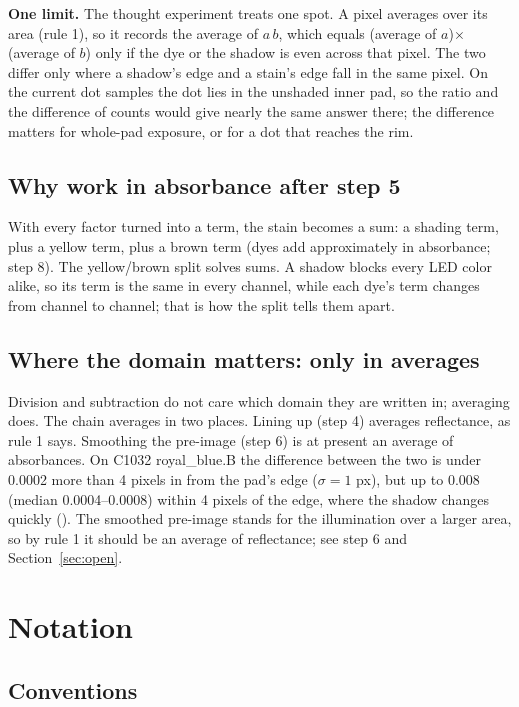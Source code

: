 \documentclass[11pt,letter]{article}
\newcommand{\file}[1]{\texttt{\seqsplit{#1}}}
\begin{document}
\textbf{One limit.}  The thought experiment treats one spot.  A pixel
averages over its area (rule 1), so it records the average of $a\,b$, which
equals (average of $a$)$\times$(average of $b$) only if the dye or the shadow
is even across that pixel.  The two differ only where a shadow's edge and a
stain's edge fall in the same pixel.  On the current dot samples the dot
lies in the unshaded inner pad, so the ratio and the difference of counts
would give nearly the same answer there; the difference matters for
whole-pad exposure, or for a dot that reaches the rim.

\subsection{Why work in absorbance after step 5}

With every factor turned into a term, the stain becomes a sum: a shading
term, plus a yellow term, plus a brown term (dyes add approximately in
absorbance; step 8).  The yellow/brown split solves sums.  A shadow blocks
every LED color alike, so its term is the same in every channel, while each
dye's term changes from channel to channel; that is how the split tells
them apart.

\subsection{Where the domain matters: only in averages}

Division and subtraction do not care which domain they are written in;
averaging does.  The chain averages in two places.  Lining up (step 4)
averages reflectance, as rule 1 says.  Smoothing the pre-image (step 6) is
at present an average of absorbances.  On C1032 royal\_blue.B the
difference between the two is under 0.0002 more than 4 pixels in from the
pad's edge ($\sigma = 1$ px), but up to 0.008 (median 0.0004--0.0008)
within 4 pixels of the edge, where the shadow changes quickly
(\file{chain\_example.smooth\_mean\_check}).  The smoothed pre-image stands
for the illumination over a larger area, so by rule 1 it should be an
average of reflectance; see step 6 and Section~\ref{sec:open}.

\section{Notation}
\label{sec:notation}

\subsection{Conventions}
\end{document}
